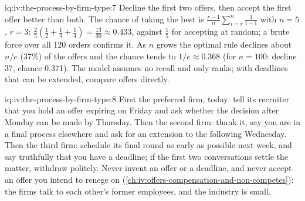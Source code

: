 \begin{solution}{iq:iv:the-process-by-firm-type:7}
Decline the first two offers, then accept the first offer better than both. The chance of taking the best is
$\tfrac{r-1}{n}\sum_{i=r}^{n}\tfrac{1}{i-1}$ with $n = 5$, $r = 3$: $\tfrac25(\tfrac12 + \tfrac13 +
\tfrac14) = \tfrac{13}{30} \approx 0.433$, against $\tfrac15$ for accepting at random; a brute force over all
120 orders confirms it. As $n$ grows the optimal rule declines about $n/e$ (37\%) of the offers and the chance
tends to $1/e \approx 0.368$ (for $n = 100$: decline 37, chance 0.371). The model assumes no recall and only
ranks; with deadlines that can be extended, compare offers directly.
\end{solution}

\begin{solution}{iq:iv:the-process-by-firm-type:8}
First the preferred firm, today: tell its recruiter that you hold an offer expiring on Friday and ask
whether the decision after Monday can be made by Thursday. Then the second firm: thank it, say you are in a
final process elsewhere and ask for an extension to the following Wednesday. Then the third firm: schedule
its final round as early as possible next week, and say truthfully that you have a deadline; if the first two
conversations settle the matter, withdraw politely. Never invent an offer or a deadline, and never accept an
offer you intend to renege on (\cref{ch:iv:offers-compensation-and-non-competes}): the firms talk to each
other's former employees, and the industry is small.
\end{solution}
